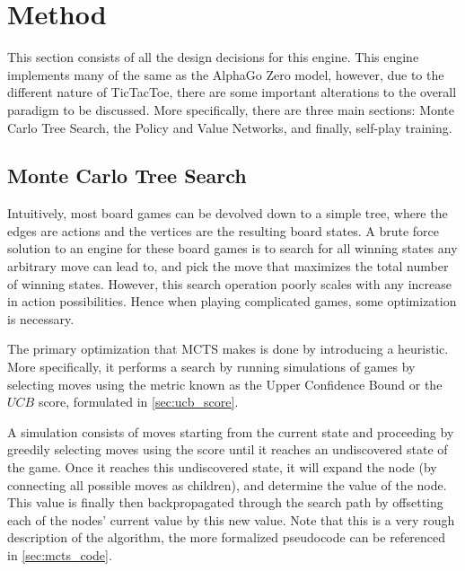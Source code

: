 \section{Method}

This section consists of all the design decisions for this engine. This engine implements many of the same as the AlphaGo Zero model, however, due to the different nature of TicTacToe, there are some important alterations to the overall paradigm to be discussed. More specifically, there are three main sections: Monte Carlo Tree Search, the Policy and Value Networks, and finally, self-play training.
\subsection{Monte Carlo Tree Search}
Intuitively, most board games can be devolved down to a simple tree, where the edges are actions and the vertices are the resulting board states. A brute force solution to an engine for these board games is to search for all winning states any arbitrary move can lead to, and pick the move that maximizes the total number of winning states. However, this search operation poorly scales with any increase in action possibilities. Hence when playing complicated games, some optimization is necessary. 

The primary optimization that MCTS makes is done by introducing a heuristic. More specifically, it performs a search by running simulations of games by selecting moves using the metric known as the Upper Confidence Bound or the $UCB$ score, formulated in \cref{sec:ucb_score}.

A simulation consists of moves starting from the current state and proceeding by greedily selecting moves using the score until it reaches an undiscovered state of the game. Once it reaches this undiscovered state, it will expand the node (by connecting all possible moves as children), and determine the value of the node. This value is finally then backpropagated through the search path by offsetting each of the nodes' current value by this new value. Note that this is a very rough description of the algorithm, the more formalized pseudocode can be referenced in \cref{sec:mcts_code}.



